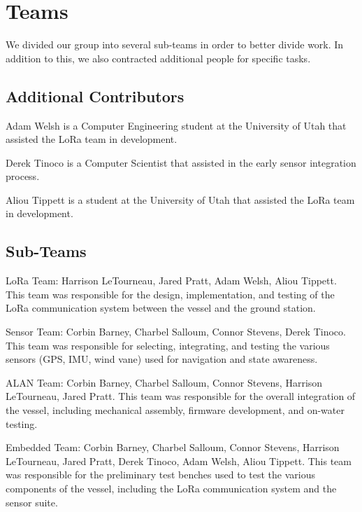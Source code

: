 
\section{Teams}
\label{app:teams}

We divided our group into several sub-teams in order to better divide work. In addition to this, we also contracted additional people for specific tasks.


\subsection{Additional Contributors}

Adam Welsh is a Computer Engineering student at the University of Utah that assisted the LoRa team in development.

Derek Tinoco is a Computer Scientist that assisted in the early sensor integration process.

Aliou Tippett is a student at the University of Utah that assisted the LoRa team in development.


\subsection{Sub-Teams}

LoRa Team: Harrison LeTourneau, Jared Pratt, Adam Welsh, Aliou Tippett. This team was responsible for the design, implementation, and testing of the LoRa communication system between the vessel and the ground station.

Sensor Team: Corbin Barney, Charbel Salloum, Connor Stevens, Derek Tinoco. This team was responsible for selecting, integrating, and testing the various sensors (GPS, IMU, wind vane) used for navigation and state awareness.

ALAN Team: Corbin Barney, Charbel Salloum, Connor Stevens, Harrison LeTourneau, Jared Pratt. This team was responsible for the overall integration of the vessel, including mechanical assembly, firmware development, and on-water testing.

Embedded Team: Corbin Barney, Charbel Salloum, Connor Stevens, Harrison LeTourneau, Jared Pratt, Derek Tinoco, Adam Welsh, Aliou Tippett. This team was responsible for the preliminary test benches used to test the various components of the vessel, including the LoRa communication system and the sensor suite.

